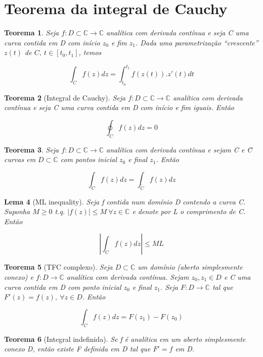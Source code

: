 \documentclass{article}
\newtheorem{theorem}{Teorema}
\newtheorem{lemma}[theorem]{Lema}
\begin{document}
\section*{Teorema da integral de Cauchy}
\label{s5}
\begin{theorem}
Seja $f: D \subset \mathbb{C} \to \mathbb{C}$ analítica com derivada contínua e seja C uma curva contida em D com início $z_0$ e fim $z_1$. Dada uma parametrização ``crescente'' $z(t)$ de $C,\ t \in [t_0, t_1]$, temos

$$\int_C f(z) d z = \int_{t_0}^{t_1} f(z(t)) . z'(t) d t$$
\end{theorem}

\begin{theorem}[Integral de Cauchy]
Seja $f: D \subset \mathbb{C} \to \mathbb{C}$ analítica com derivada contínua e seja C uma curva contida em D com início e fim iguais. Então

$$\oint_C f(z) d z = 0$$
\end{theorem}

\begin{theorem}
Seja $f: D \subset \mathbb{C} \to \mathbb{C}$ analítica com derivada contínua e sejam C e \~C curvas em $D \subset \mathbb{C}$ com pontos inicial $z_0$ e final $z_1$. Então

$$\int_C f(z) d z = \int_{\tilde{C}} f(z) d z$$
\end{theorem}

\begin{lemma}[ML inequality]
Seja f contida num domínio D contendo a curva C. Suponha $M \geq 0$ t.q. $| f(z) | \leq M\ \forall z \in \mathbb{C}$ e denote por L o comprimento de C. Então

$$\left | \int_C f(z) d z \right | \leq M L$$
\end{lemma}

\begin{theorem}[TFC complexo]
Seja $D \subset \mathbb{C}$ um domínio (aberto simplesmente conexo) e $f: D \rightarrow \mathbb{C}$ analítica com derivada contínua. Sejam $z_0, z_1 \in D$ e C uma curva contida em D com ponto inicial $z_0$ e final $z_1$. Seja $F: D \rightarrow \mathbb{C}$ tal que $F'(z) = f(z),\ \forall z \in D$. Então

$$\int_C f(z) d z = F(z_1) - F(z_0)$$
\end{theorem}

\begin{theorem}[Integral indefinida]
Se f é analítica em um aberto simplesmente conexo D, então existe F definida em D tal que $F' = f$ em D.
\end{theorem}
\end{document}

